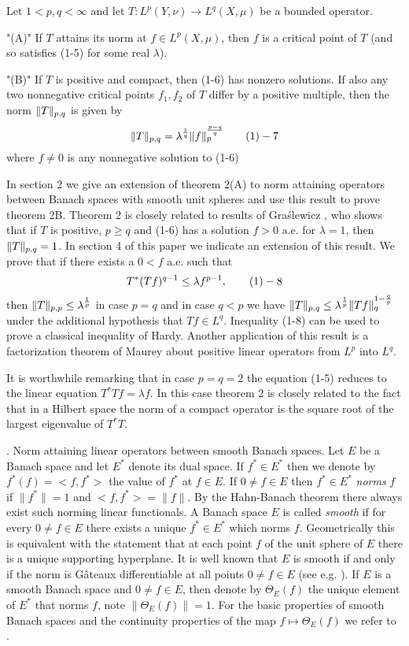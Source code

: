 Let $1<p,q<\infty$ and let $T: L^{p}(Y,\nu ) \to
 L^{q}(X,\mu )$ be a bounded operator.
\roster
\item"(A)" If $T$ attains its norm at $f\in L^p(X,\mu)$, then $f$ is a
critical
point of $T$ (and so satisfies (1-5) for some real $\lambda$).
\item"(B)" If $T$ is positive and compact, then (1-6) has nonzero solutions. If
also any two nonnegative critical points $f_1,f_2$ of $T$ differ by a positive
multiple, then the norm $\| T\| _{p,q}$ is given by
$$\ntpq = \lambda^{\frac 1q} \nfp ^{\frac {p-q}q} \tag 1-7$$
where $f\neq 0$ is any nonnegative solution to (1-6)
\endroster
\endproclaim

In section 2 we give an extension of theorem 2(A) to norm attaining operators
between Banach spaces with smooth unit spheres and use this result to prove
theorem 2B.  Theorem 2 is closely related to results of Gra\'slewicz \cite
{Gr}, who shows that if $T$ is positive, $p\ge q$ and (1-6) has a solution
$f>0$ a.e. for $\lambda =1$, then $\| T\| _{p,q} =1$. In  section 4 of this paper we
indicate an extension of this result. We prove that if there exists a $0<f$
a.e. such that 
$$T^*(Tf)^{q-1}\le \lambda f^{p-1}, \tag 1-8
$$ then $\| T\| _{p,p} \le \lambda^{\frac 1p}$ in case $p=q$ and in case $q<p$ we have
$\| T\| _{p,q} \le \lambda ^{\frac 1p} \| Tf\|_{q}^{1-\frac qp}$ under the additional
hypothesis that $Tf\in L^q$. Inequality (1-8) can be used to prove a classical
inequality of Hardy. Another application of this result is a factorization
theorem of Maurey about positive linear operators from $L^p$ into $L^q$. 

It is worthwhile remarking that in case $p=q=2$ the equation (1-5) reduces to
the linear equation $T^*Tf= \lambda f$. In this case theorem 2 is closely
related to the fact that in a Hilbert space the norm of a compact operator is
the square root of the largest eigenvalue of $T^*T$.


. Norm attaining linear operators between smooth Banach spaces.
\endheading Let $E$ be a Banach space and let $E^*$ denote its dual space. If
$f^*\in E^*$ then we denote by $f^*(f)= <f,f^*>$   the value of $f^*$ at
$f\in E$. If $0\neq f\in E$ then $f^*\in E^*$ {\it norms\/} $f$ if $\| f^*\|
=1$ and $<f,f^*>=\| f\|$. By the Hahn-Banach theorem there always exist such
norming linear functionals. A Banach space $E$ is called {\it smooth \/} if for
every $0\neq f\in E$ there exists a unique $f^*\in E^*$ which norms $f$.
Geometrically this is equivalent with the statement that at each point $f $ of
the unit sphere of $E$ there is a unique supporting hyperplane. It is well
known that $E$ is smooth if and only if the norm is G\^ateaux differentiable at
all points $0\neq f\in E$ (see e.g. \cite{B}). If $E$ is a smooth Banach space
and $0\neq f\in E$, then denote by $\Theta _E(f)$ the unique element of $E^*$
that norms $f$, note $\| \Theta_E (f)\| =1$. For the basic properties of smooth
Banach spaces and the continuity properties of the map $f \mapsto \Theta_E(f)$
we refer to \cite{B, part 3 Chapter 1}.

